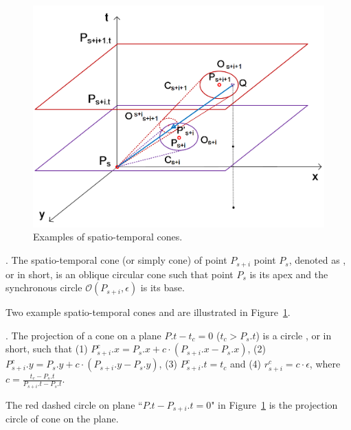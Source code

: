 \begin{figure}[tb!]
\centering
\includegraphics[scale=0.66]{figures/Fig-cis.png}
\vspace{-2ex}
\caption{\small Examples of spatio-temporal cones. }
\vspace{-3ex}
\label{fig:cis}
\end{figure}



. The spatio-temporal cone (or simply cone) of point $P_{s+i}$ \wrt point $P_s$, denoted as , or  in short, is an oblique circular cone such that point $P_s$ is its apex and the synchronous circle $\mathcal{O}(P_{s+i}, \epsilon)$ is its base.

Two example spatio-temporal cones  and  are illustrated in Figure~\ref{fig:cis}.

. The projection of a cone  on a plane $P.t- t_c = 0$ ($t_c > P_s.t$) is a circle , or  in short, such that
%
(1) $P^c_{s+i}.x = P_s.x +  c\cdot(P_{s+i}.x- P_{s}.x)$,
%
(2) $P^c_{s+i}.y = P_s.y +  c\cdot(P_{s+i}.y- P_{s}.y)$,
%
(3) $P^c_{s+i}.t = t_c$ and
%
(4) $r^c_{s+i} =c\cdot\epsilon$, where $c=\frac{t_c - P_s.t}{P_{s+i}.t - P_s.t}$.


The red dashed circle  on plane ``$P.t-P_{s+i}.t=0$" in Figure~\ref{fig:cis} is the projection circle of cone  on the plane.


